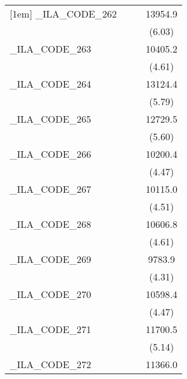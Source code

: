 {\begin{tabular}{l*{3}{c}}
[1em]
\_ILA\_CODE\_262&                     &                     &     13954.9\sym{***}\\
            &                     &                     &      (6.03)         \\
[1em]
\_ILA\_CODE\_263&                     &                     &     10405.2\sym{***}\\
            &                     &                     &      (4.61)         \\
[1em]
\_ILA\_CODE\_264&                     &                     &     13124.4\sym{***}\\
            &                     &                     &      (5.79)         \\
[1em]
\_ILA\_CODE\_265&                     &                     &     12729.5\sym{***}\\
            &                     &                     &      (5.60)         \\
[1em]
\_ILA\_CODE\_266&                     &                     &     10200.4\sym{***}\\
            &                     &                     &      (4.47)         \\
[1em]
\_ILA\_CODE\_267&                     &                     &     10115.0\sym{***}\\
            &                     &                     &      (4.51)         \\
[1em]
\_ILA\_CODE\_268&                     &                     &     10606.8\sym{***}\\
            &                     &                     &      (4.61)         \\
[1em]
\_ILA\_CODE\_269&                     &                     &      9783.9\sym{***}\\
            &                     &                     &      (4.31)         \\
[1em]
\_ILA\_CODE\_270&                     &                     &     10598.4\sym{***}\\
            &                     &                     &      (4.47)         \\
[1em]
\_ILA\_CODE\_271&                     &                     &     11700.5\sym{***}\\
            &                     &                     &      (5.14)         \\
[1em]
\_ILA\_CODE\_272&                     &                     &     11366.0\sym{***}\\

\end{tabular}}
